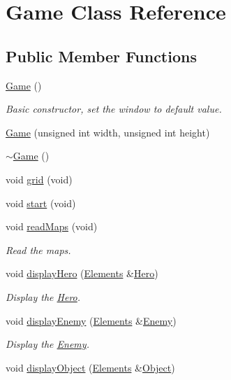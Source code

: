 \hypertarget{class_game}{\section{Game Class Reference}
\label{class_game}
}
\subsection*{Public Member Functions}
\begin{DoxyCompactItemize}
\item 
\hyperlink{class_game_ad59df6562a58a614fda24622d3715b65}{Game} ()
\begin{DoxyCompactList}\small\item\em Basic constructor, set the window to default value. \end{DoxyCompactList}\item 
\hyperlink{class_game_a20220a5fdc31f41d6c642f70204799d0}{Game} (unsigned int width, unsigned int height)
\item 
\hyperlink{class_game_ae3d112ca6e0e55150d2fdbc704474530}{$\sim$\+Game} ()
\item 
void \hyperlink{class_game_a616466e4850732139841c148ed18c05f}{grid} (void)
\item 
void \hyperlink{class_game_a662a1969275a12a8ffebf2e53e8c843a}{start} (void)
\item 
void \hyperlink{class_game_af06f40bacd46f8facba328648cb221b5}{read\+Maps} (void)
\begin{DoxyCompactList}\small\item\em Read the maps. \end{DoxyCompactList}\item 
void \hyperlink{class_game_a82b79f027868bb70c2325f473a0270a9}{display\+Hero} (\hyperlink{class_elements}{Elements} \&\hyperlink{class_hero}{Hero})
\begin{DoxyCompactList}\small\item\em Display the \hyperlink{class_hero}{Hero}. \end{DoxyCompactList}\item 
void \hyperlink{class_game_abbb01372bc9b6703a49d5960fb62ff0b}{display\+Enemy} (\hyperlink{class_elements}{Elements} \&\hyperlink{class_enemy}{Enemy})
\begin{DoxyCompactList}\small\item\em Display the \hyperlink{class_enemy}{Enemy}. \end{DoxyCompactList}\item 
void \hyperlink{class_game_a6ce6fb87e236965d8b1d3ca7143337f6}{display\+Object} (\hyperlink{class_elements}{Elements} \&\hyperlink{class_object}{Object})

\end{DoxyCompactItemize}
